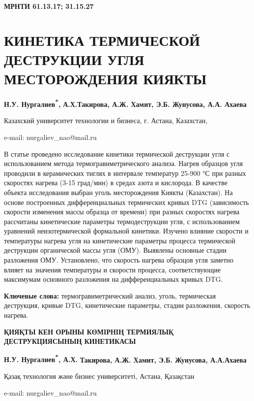 \clearpage
{\bfseries МРНТИ 61.13.17; 31.15.27}

\section{КИНЕТИКА ТЕРМИЧЕСКОЙ ДЕСТРУКЦИИ УГЛЯ МЕСТОРОЖДЕНИЯ КИЯКТЫ}

\begin{center}
{\bfseries Н.У. Нургалиев\textsuperscript{*},} {\bfseries А.Х.Такирова, А.Ж.
Хамит, Э.Б. Жунусова, А.А. Ахаева}

Казахский университет технологии и бизнеса, г. Астана, Казахстан,

e-mail: nurgaliev\_nao@mail.ru
\end{center}

В статье проведено исследование кинетики термической деструкции угля с
использованием метода термогравиметрического анализа. Нагрев образцов
угля проводили в керамических тиглях в интервале температур 25-900 °С
при разных скоростях нагрева (3-15 град/мин) в средах азота и кислорода.
В качестве объекта исследования выбран уголь месторождения Киякты
(Казахстан). На основе построенных дифференциальных термических кривых
DTG (зависимость скорости изменения массы образца от времени) при разных
скоростях нагрева рассчитаны кинетические параметры термодеструкции
угля, с использованием уравнений неизотермической формальной кинетики.
Изучено влияние скорости и температуры нагрева угля на кинетические
параметры процесса термической деструкции органической массы угля (ОМУ).
Выявлены основные стадии разложения ОМУ. Установлено, что скорость
нагрева образцов угля заметно влияет на значения температуры и скорости
процесса, соответствующие максимумам основного разложения на
дифференциальных кривых DTG.

{\bfseries Ключевые слова:} термогравиметрический анализ, уголь,
термическая деструкция, кривые DTG, кинетические параметры, стадии
разложения, скорость нагрева.

\begin{center}
{\large\bfseries ҚИЯҚТЫ КЕН ОРЫНЫ КӨМІРНІҢ ТЕРМИЯЛЫҚ ДЕСТРУКЦИЯСЫНЫҢ КИНЕТИКАСЫ}

\vspace{1em}
{\bfseries Н.У. Нургалиев\textsuperscript{*}, А.Х.} {\bfseries Такирова, А.Ж.
Хамит, Э.Б. Жунусова, А.А.Ахаева}

Қазақ технология және бизнес университеті, Астана, Қазақстан

e-mail: nurgaliev\_nao@mail.ru
\end{center}

